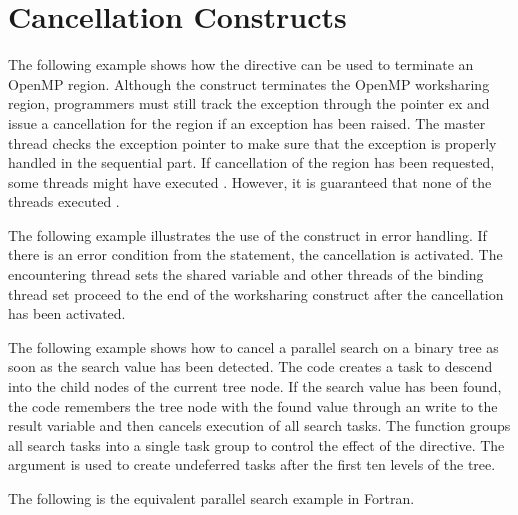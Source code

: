 \pagebreak
\section{Cancellation Constructs}
\label{sec:cancellation}

The following example shows how the  directive can be used to terminate 
an OpenMP region. Although the  construct terminates the OpenMP 
worksharing region, programmers must still track the exception through the pointer 
ex and issue a cancellation for the  region if an exception has 
been raised. The master thread checks the exception pointer to make sure that the 
exception is properly handled in the sequential part. If cancellation of the  
region has been requested, some threads might have executed . 
However, it is guaranteed that none of the threads executed .



The following example illustrates the use of the  construct in error 
handling. If there is an error condition from the  statement, 
the cancellation is activated. The encountering thread sets the shared variable 
 and other threads of the binding thread set proceed to the end of 
the worksharing construct after the cancellation has been activated. 


\clearpage

The following example shows how to cancel a parallel search on a binary tree as 
soon as the search value has been detected. The code creates a task to descend 
into the child nodes of the current tree node. If the search value has been found, 
the code remembers the tree node with the found value through an  
write to the result variable and then cancels execution of all search tasks. The 
function  groups all search tasks into a single 
task group to control the effect of the  directive. The 
 argument is used to create undeferred tasks after the first ten 
levels of the tree.



The following is the equivalent parallel search example in Fortran.



